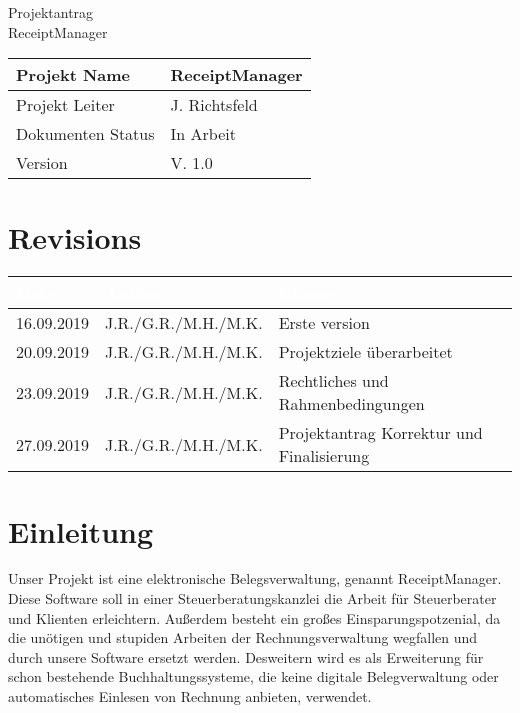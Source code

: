 \documentclass[12pt]{article}
\theoremstyle{definition}
\newcommand{\projectname}{ReceiptManager}
\newcommand{\productname}{ReceiptManager}
\newcommand{\projectleader}{J. Richtsfeld}
\newcommand{\documentstatus}{In Arbeit}
\newcommand{\version}{V. 1.0}
\begin{document}
\begin{titlepage}
\begin{flushright}
\end{flushright}

\vspace{10em}

\begin{center}
{\Huge Projektantrag} \\[3em]
{\LARGE \productname} \\[3em]
\end{center}

\begin{flushleft}
\begin{tabular}{|l|l|}
\hline
Projekt Name & \projectname \\ \hline
Projekt Leiter & \projectleader \\ \hline
Dokumenten Status & \documentstatus \\ \hline
Version & \version \\ \hline
\end{tabular}
\end{flushleft}

\end{titlepage}
\section*{Revisions}
\begin{tabular}{|l|l|l|}
\hline
\cellcolor[gray]{0.5}\textcolor{white}{Date} & \cellcolor[gray]{0.5}\textcolor{white}{Author} & \cellcolor[gray]{0.5}\textcolor{white}{Change} \\ \hline
16.09.2019&J.R./G.R./M.H./M.K.&Erste version \\ \hline
20.09.2019&J.R./G.R./M.H./M.K.&Projektziele überarbeitet \\ \hline
23.09.2019&J.R./G.R./M.H./M.K.&Rechtliches und Rahmenbedingungen \\ \hline
27.09.2019&J.R./G.R./M.H./M.K.&Projektantrag Korrektur und Finalisierung \\ \hline
\end{tabular}
\pagebreak

\tableofcontents
\pagebreak

\section{Einleitung}
Unser Projekt ist eine elektronische Belegsverwaltung, genannt ReceiptManager. Diese Software soll in einer Steuerberatungskanzlei die Arbeit für Steuerberater und Klienten erleichtern. Außerdem besteht ein großes Einsparungspotzenial, da die unötigen und stupiden Arbeiten der Rechnungsverwaltung wegfallen und durch unsere Software ersetzt werden. Desweitern wird es als Erweiterung für schon bestehende Buchhaltungssysteme, die keine digitale Belegverwaltung oder automatisches Einlesen von Rechnung anbieten, verwendet.
\pagebreak
\end{document}
